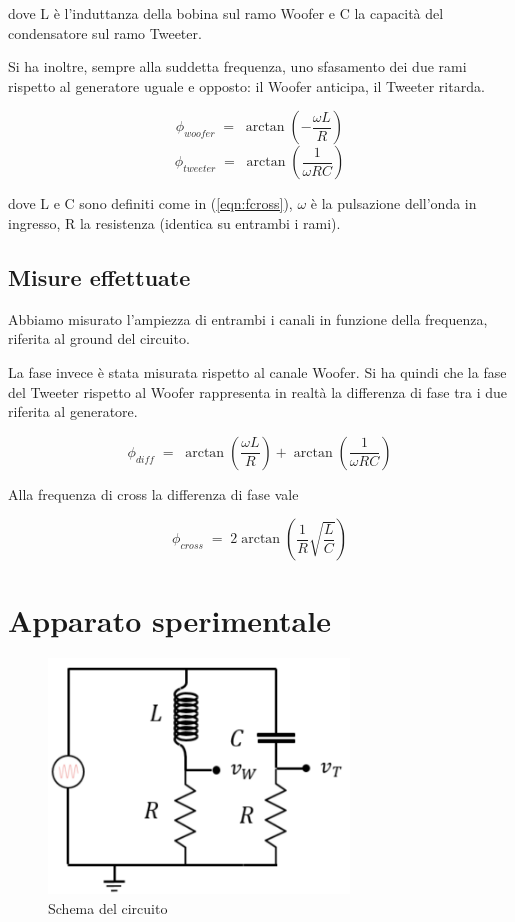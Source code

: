 \documentclass[12pt,a4paper]{article}
\begin{document}
dove L è l'induttanza della bobina sul ramo Woofer e C la capacità del condensatore sul ramo Tweeter.

Si ha inoltre, sempre alla suddetta frequenza, uno sfasamento dei due rami rispetto al generatore uguale e opposto: il Woofer anticipa, il Tweeter ritarda. 

\begin{equation}
\label{eqn:p_woofer}
\phi_{woofer} \; = \; \arctan(-\frac{\omega L}{R})
\end{equation}
\begin{equation}
\label{eqn:p_tweeter}
\phi_{tweeter} \; = \; \arctan(\frac{1}{\omega RC})
\end{equation}

dove L e C sono definiti come in (\ref{eqn:fcross}), $\omega$ è la pulsazione dell'onda in ingresso, R la resistenza (identica su entrambi i rami).

\subsection{Misure effettuate}
Abbiamo misurato l'ampiezza di entrambi i canali in funzione della frequenza, riferita al ground del circuito. 

La fase invece è stata misurata rispetto al canale Woofer. Si ha quindi che la fase del Tweeter rispetto al Woofer rappresenta in realtà la differenza di fase tra i due riferita al generatore.

\begin{equation}
\label{eqn: p_diff}
\phi_{diff} \; = \; \arctan(\frac{\omega L}{R}) + \arctan(\frac{1}{\omega RC})
\end{equation}

Alla frequenza di cross la differenza di fase vale

\begin{equation}
\label{eqn: pdiff_CROSS}
\phi_{cross} \; = \; 2 \arctan(\frac{1}{R} \sqrt{\frac{L}{C}})
\end{equation}

\section{Apparato sperimentale}

\begin{figure}[H]
\centering
\includegraphics[width=8cm]{crossover_scheme.png}

\caption{Schema del circuito}
\label{Fig1}

\end{figure}
\end{document}
